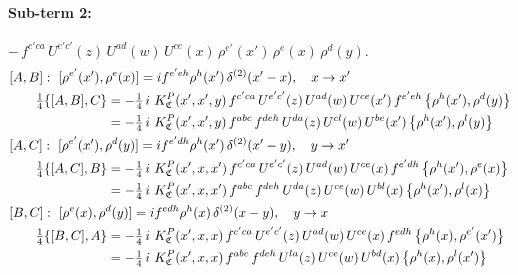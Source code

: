 \documentclass[10pt]{article}
\numberwithin{equation}{section}
\begin{document}
\paragraph{Sub-term 2:} $-\,f^{c'ca}\,U^{e'c'}(z)\,U^{ad}(w)\,U^{ce}(x)\,\rho^{e'}(x')\,\rho^{e}(x)\,\rho^{d}(y)$.
\begin{align}
&[A,B]:\ [\rho^{e'}(x'),\rho^{e}(x)]=i f^{e'eh}\rho^{h}(x')\,\delta^{(2)}(x'-x),\quad x\to x'\notag\\
&\qquad \tfrac14\{[A,B],C\}=-\tfrac14\,i\,\,K^{P}_{\mathfrak C}(x',x',y)\,f^{c'ca}\,U^{e'c'}(z)\,U^{ad}(w)\,U^{ce}(x')\,f^{e'eh}\,\big\{\rho^{h}(x'),\rho^{d}(y)\big\}\notag\\
&\qquad\phantom{\tfrac14\{[A,B],C\}}=-\tfrac14\,i\,\,K^{P}_{\mathfrak C}(x',x',y)\,f^{abc}\,f^{deh}\,U^{da}(z)\,U^{cl}(w)\,U^{be}(x')\,\big\{\rho^{h}(x'),\rho^{l}(y)\big\}
\label{eq:GIII.V.P-2-AB}\\
&[A,C]:\ [\rho^{e'}(x'),\rho^{d}(y)]=i f^{e'dh}\rho^{h}(x')\,\delta^{(2)}(x'-y),\quad y\to x'\notag\\
&\qquad \tfrac14\{[A,C],B\}=-\tfrac14\,i\,\,K^{P}_{\mathfrak C}(x',x,x')\,f^{c'ca}\,U^{e'c'}(z)\,U^{ad}(w)\,U^{ce}(x)\,f^{e'dh}\,\big\{\rho^{h}(x'),\rho^{e}(x)\big\}\notag\\
&\qquad\phantom{\tfrac14\{[A,C],B\}}=-\tfrac14\,i\,\,K^{P}_{\mathfrak C}(x',x,x')\,f^{abc}\,f^{deh}\,U^{da}(z)\,U^{ce}(w)\,U^{bl}(x)\,\big\{\rho^{h}(x'),\rho^{l}(x)\big\}
\label{eq:GIII.V.P-2-AC}\\
&[B,C]:\ [\rho^{e}(x),\rho^{d}(y)]=i f^{edh}\rho^{h}(x)\,\delta^{(2)}(x-y),\quad y\to x\notag\\
&\qquad \tfrac14\{[B,C],A\}=-\tfrac14\,i\,\,K^{P}_{\mathfrak C}(x',x,x)\,f^{c'ca}\,U^{e'c'}(z)\,U^{ad}(w)\,U^{ce}(x)\,f^{edh}\,\big\{\rho^{h}(x),\rho^{e'}(x')\big\}\notag\\
&\qquad\phantom{\tfrac14\{[B,C],A\}}=-\tfrac14\,i\,\,K^{P}_{\mathfrak C}(x',x,x)\,f^{abc}\,f^{deh}\,U^{la}(z)\,U^{ce}(w)\,U^{bd}(x)\,\big\{\rho^{h}(x),\rho^{l}(x')\big\}
\label{eq:GIII.V.P-2-BC}
\end{align}
\end{document}
